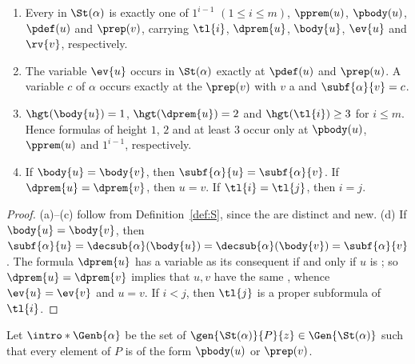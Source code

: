 \begin{lemma}\label{lem:shape}
\leavevmode
\begin{enumerate}
\item[(a)] Every  in $\St(\alpha)$ is exactly one of
  $1^{i-1}$ $(1\le i\le m)$, $\pprem(u)$, $\pbody(u)$, $\pdef(u)$ and
  $\prep(v)$, carrying $\tl{i}$, $\dprem{u}$, $\body{u}$, $\ev{u}$ and
  $\rv{v}$, respectively.
\item[(b)] The variable $\ev{u}$ occurs in $\St(\alpha)$ exactly at
  $\pdef(u)$ and $\prep(u)$. A variable $c$ of $\alpha$ occurs exactly at
  the $\prep(v)$ with $v$ a  and $\subf{\alpha}{v}=c$.
\item[(c)] $\hgt(\body{u})=1$, $\hgt(\dprem{u})=2$ and $\hgt(\tl{i})\ge3$
  for $i\le m$. Hence formulas of height $1$, $2$ and at least $3$ occur only
  at  $\pbody(u)$, $\pprem(u)$ and $1^{i-1}$, respectively.
\item[(d)] If $\body{u}=\body{v}$, then $\subf{\alpha}{u}=\subf{\alpha}{v}$.
  If $\dprem{u}=\dprem{v}$, then $u=v$. If $\tl{i}=\tl{j}$, then $i=j$.
\end{enumerate}
\end{lemma}
\begin{proof}
(a)--(c) follow from Definition~\ref{def:S}, since the  are distinct and new. (d) If $\body{u}=\body{v}$, then
$\subf{\alpha}{u}=\decsub{\alpha}(\body{u})=\decsub{\alpha}(\body{v})=\subf{\alpha}{v}$.
The formula $\dprem{u}$ has a variable as its consequent if and only if $u$
is ; so $\dprem{u}=\dprem{v}$ implies that $u,v$ have the same
, whence $\ev{u}=\ev{v}$ and $u=v$. If $i<j$, then $\tl{j}$
is a proper subformula of $\tl{i}$.
\end{proof}

\AP Let $\intro*\Genb{\alpha}$ be the set of
$\gen{\St(\alpha)}{P}{z}\in\Gen{\St(\alpha)}$ such that every element of $P$
is of the form $\pbody(u)$ or $\prep(v)$.

